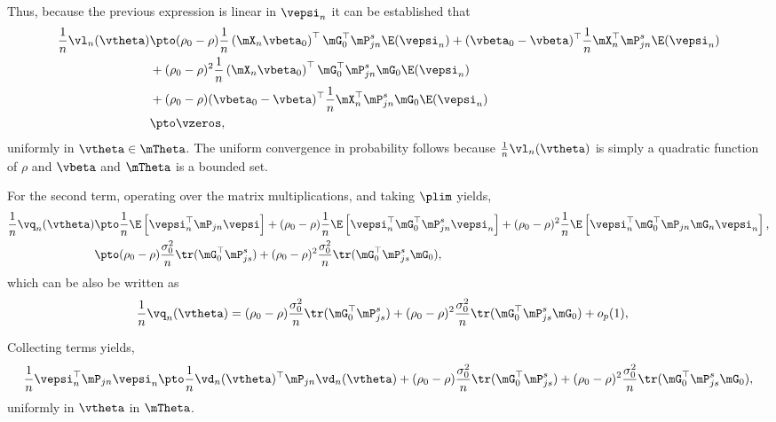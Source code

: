 Thus, because the previous expression is linear in $\vepsi_n$ it can be established that
\begin{equation*}
  \begin{aligned}
    \frac{1}{n}\vl_n(\vtheta) & \pto  (\rho_0 - \rho)\frac{1}{n}\left(\mX_n\vbeta_0\right)^\top \mG_0^\top \mP_{jn}^s\E(\vepsi_n) + (\vbeta_0 - \vbeta)^\top \frac{1}{n}\mX_n^\top\mP_{jn}^s\E(\vepsi_n) \\
    & +  (\rho_0 - \rho)^2\frac{1}{n}\left(\mX_n\vbeta_0\right)^\top \mG_0^\top \mP_{jn}^s\mG_0\E(\vepsi_n) \\
    & + (\rho_0 - \rho)(\vbeta_0 - \vbeta)^\top\frac{1}{n}\mX_n^\top\mP_{jn}^s\mG_0\E(\vepsi_{n}) \\
    & \pto \vzeros, 
  \end{aligned}
\end{equation*}
uniformly in $\vtheta \in \mTheta$. The uniform convergence in probability follows because $\frac{1}{n}\vl_n(\vtheta)$ is simply a quadratic function of $\rho$ and $\vbeta$ and $\mTheta$ is a bounded set. 

For the second term, operating over the matrix multiplications, and taking $\plim$ yields, 
\begin{equation*}
  \begin{aligned}
    \frac{1}{n}\vq_n(\vtheta) & \pto  \frac{1}{n}\E\left[\vepsi_n^\top\mP_{jn}\vepsi\right] + (\rho_0 - \rho)\frac{1}{n}\E\left[\vepsi_n^\top\mG_0^\top\mP_{jn}^s\vepsi_n\right]  + (\rho_0 - \rho)^2\frac{1}{n}\E\left[\vepsi_n^\top\mG_0^\top\mP_{jn}\mG_n\vepsi_n\right],  \\
    & \pto (\rho_0 - \rho) \frac{\sigma_0^2}{n}\tr(\mG_0^\top\mP_{js}^s) + (\rho_0-\rho)^2\frac{\sigma_0^2}{n}\tr(\mG_0^\top\mP_{js}^s\mG_0),  
  \end{aligned}
\end{equation*} 
%
which can be also be written as
\begin{equation*}
  \begin{aligned}
    \frac{1}{n}\vq_n(\vtheta) & = (\rho_0 - \rho) \frac{\sigma_0^2}{n}\tr(\mG_0^\top\mP_{js}^s) + (\rho_0-\rho)^2\frac{\sigma_0^2}{n}\tr(\mG_0^\top\mP_{js}^s\mG_0) + o_p(1), 
  \end{aligned}
\end{equation*} 

Collecting terms yields, 
\begin{equation*}
\begin{aligned}
\frac{1}{n}\vepsi_n^\top\mP_{jn}\vepsi_n \pto \frac{1}{n}\vd_n(\vtheta)^\top\mP_{jn}\vd_n(\vtheta) + (\rho_0 - \rho) \frac{\sigma_0^2}{n}\tr(\mG_0^\top\mP_{js}^s) + (\rho_0-\rho)^2\frac{\sigma_0^2}{n}\tr(\mG_0^\top\mP_{js}^s\mG_0),
\end{aligned}
\end{equation*}
%
uniformly in $\vtheta$ in $\mTheta$. 

